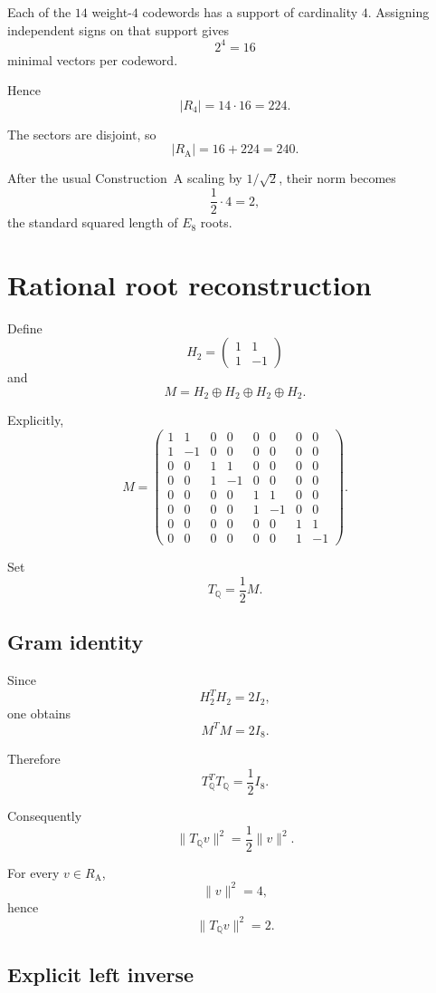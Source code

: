 \documentclass[11pt,a4paper]{article}
\theoremstyle{definition}
\theoremstyle{remark}
\newcommand{\RA}{R_{\mathrm A}}
\newcommand{\TQ}{T_{\mathbb Q}}
\begin{document}
Each of the $14$ weight-$4$ codewords has a support of cardinality $4$.
Assigning independent signs on that support gives
\[
2^4=16
\]
minimal vectors per codeword.

Hence
\[
|R_4|
=
14\cdot16
=
224.
\]

The sectors are disjoint, so
\[
\boxed{
|\RA|
=
16+224
=
240.
}
\]

After the usual Construction~A scaling by $1/\sqrt2$, their norm becomes
\[
\frac12\cdot4=2,
\]
the standard squared length of $E_8$ roots.

\section{Rational root reconstruction}

Define
\[
H_2=
\begin{pmatrix}
1&1\\
1&-1
\end{pmatrix}
\]
and
\[
M=
H_2\oplus H_2\oplus H_2\oplus H_2.
\]

Explicitly,
\[
M=
\begin{pmatrix}
1&1&0&0&0&0&0&0\\
1&-1&0&0&0&0&0&0\\
0&0&1&1&0&0&0&0\\
0&0&1&-1&0&0&0&0\\
0&0&0&0&1&1&0&0\\
0&0&0&0&1&-1&0&0\\
0&0&0&0&0&0&1&1\\
0&0&0&0&0&0&1&-1
\end{pmatrix}.
\]

Set
\[
\TQ=\frac12M.
\]

\subsection{Gram identity}

Since
\[
H_2^TH_2=2I_2,
\]
one obtains
\[
M^TM=2I_8.
\]

Therefore
\[
\boxed{
\TQ^T\TQ
=
\frac12I_8.
}
\]

Consequently
\[
\|\TQ v\|^2
=
\frac12\|v\|^2.
\]

For every $v\in\RA$,
\[
\|v\|^2=4,
\]
hence
\[
\|\TQ v\|^2=2.
\]

\subsection{Explicit left inverse}
\end{document}
